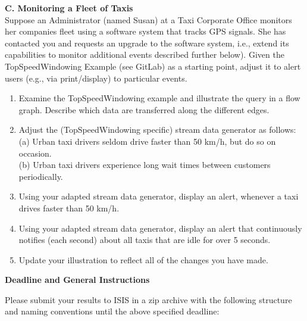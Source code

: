 \documentclass[11pt,a4paper]{article}
\newenvironment{cEnum}{
\begin{enumerate}
  \setlength{\itemsep}{0pt}
  \setlength{\parskip}{0pt}
  \setlength{\parsep}{0pt}
}{\end{enumerate}}
\begin{document}
\textbf{C. Monitoring a Fleet of Taxis}\\
Suppose an Administrator (named Susan) at a Taxi Corporate Office monitors her companies fleet using a software system that tracks GPS signals. She has contacted you and requests an upgrade to the software system, i.e., extend its capabilities to monitor additional events described further below). Given the TopSpeedWindowing Example (see GitLab) as a starting point, adjust it to alert users (e.g., via print/display) to particular events.

\begin{cEnum}
	\item Examine the TopSpeedWindowing example and illustrate the query in a flow graph. Describe which data are transferred along the different edges.
	\item Adjust the (TopSpeedWindowing specific) stream data generator as follows: \\
            (a) Urban taxi drivers seldom drive faster than 50 km/h, but do so on occasion. \\
            (b) Urban taxi drivers experience long wait times between customers periodically.	
	\item Using your adapted stream data generator, display an alert, whenever a taxi drives faster than 50 km/h.	
	\item Using your adapted stream data generator, display an alert that continuously notifies (each second) about all taxis that are idle for over 5 seconds.	
	\item Update your illustration to reflect all of the changes you have made.
\end{cEnum}

\bigskip
\centerline{\textbf{Deadline and General Instructions}}
\bigskip

Please submit your results to ISIS in a zip archive with the following structure and naming conventions until the above specified deadline:

\end{document}
